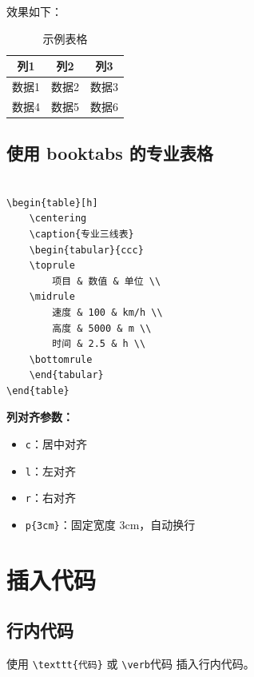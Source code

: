\documentclass[10pt,openany]{book}
\begin{document}
效果如下：
\begin{table}[h]
    \centering
    \caption{示例表格}
    \begin{tabular}{|c|c|c|}
    \hline
    列1 & 列2 & 列3 \\
    \hline
    数据1 & 数据2 & 数据3 \\
    数据4 & 数据5 & 数据6 \\
    \hline
    \end{tabular}
\end{table}

\subsection{使用 booktabs 的专业表格}

\begin{lstlisting}[style=pythonstyle]
% 导言区需要：\usepackage{booktabs}

\begin{table}[h]
    \centering
    \caption{专业三线表}
    \begin{tabular}{ccc}
    \toprule
        项目 & 数值 & 单位 \\
    \midrule
        速度 & 100 & km/h \\
        高度 & 5000 & m \\
        时间 & 2.5 & h \\
    \bottomrule
    \end{tabular}
\end{table}
\end{lstlisting}

\textbf{列对齐参数：}
\begin{itemize}
    \item \texttt{c}：居中对齐
    \item \texttt{l}：左对齐
    \item \texttt{r}：右对齐
    \item \texttt{p\{3cm\}}：固定宽度 3cm，自动换行
\end{itemize}

\section{插入代码}

\subsection{行内代码}

使用 \verb|\texttt{代码}| 或 \verb|\verb|代码\verb|| 插入行内代码。
\end{document}
